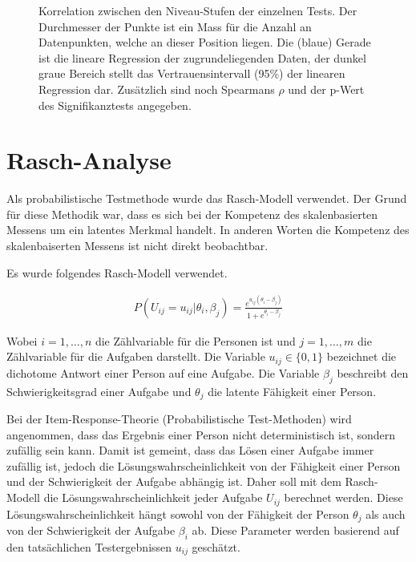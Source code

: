 \begin{figure}[htbp]
\caption{Korrelation zwischen den Niveau-Stufen der einzelnen Tests. Der Durchmesser der Punkte ist ein Mass für die Anzahl an Datenpunkten, welche an dieser Position liegen. Die (blaue) Gerade ist die lineare Regression der zugrundeliegenden Daten, der dunkel graue Bereich stellt das Vertrauensintervall (95\%) der linearen Regression dar. Zusätzlich sind noch Spearmans $\rho$ und der p-Wert des Signifikanztests angegeben.}
\label{fig:corLev}
\end{figure}


\clearpage
\section{Rasch-Analyse}

Als probabilistische Testmethode wurde das Rasch-Modell verwendet. Der Grund für diese Methodik war, dass es sich bei der Kompetenz des skalenbasierten Messens um ein latentes Merkmal handelt. In anderen Worten die Kompetenz des skalenbaiserten Messens ist nicht direkt beobachtbar.

Es wurde folgendes Rasch-Modell verwendet.

\begin{eqnarray}
P(U_{ij}=u_{ij}|\theta_i,\beta_j) = \frac{e^{u_{ij}(\theta_i-\beta_j)}}{1+e^{\theta_i-\beta_j}}
\end{eqnarray}

Wobei $i=1,…,n$ die Zählvariable für die Personen ist und $j=1,…,m$ die Zählvariable für die Aufgaben darstellt. Die Variable $u_{ij} \in \{0,1\}$ bezeichnet die dichotome Antwort einer Person auf eine Aufgabe. Die Variable $\beta_j$ beschreibt den Schwierigkeitsgrad einer Aufgabe und $\theta_j$ die latente Fähigkeit einer Person.

Bei der Item-Response-Theorie (Probabilistische Test-Methoden) wird angenommen, dass das Ergebnis einer Person nicht deterministisch ist, sondern zufällig sein kann. Damit ist gemeint, dass das Lösen einer Aufgabe immer zufällig ist, jedoch die Lösungswahrscheinlichkeit von der Fähigkeit einer Person und der Schwierigkeit der Aufgabe abhängig ist. Daher soll mit dem Rasch-Modell die Lösungswahrscheinlichkeit jeder Aufgabe $U_{ij}$ berechnet werden. Diese Lösungswahrscheinlichkeit hängt sowohl von der Fähigkeit der Person $\theta_j$ als auch von der Schwierigkeit der Aufgabe $\beta_i$ ab. Diese Parameter werden basierend auf den tatsächlichen Testergebnissen $u_{ij}$ geschätzt.

